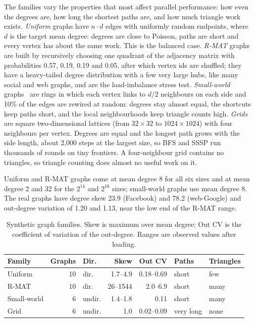 \documentclass[conference]{IEEEtran}
\begin{document}
The families vary the properties that most affect parallel performance: how even the degrees are, how long the shortest paths are, and how much triangle work exists. \textit{Uniform} graphs have $n\cdot d$ edges with uniformly random endpoints, where $d$ is the target mean degree: degrees are close to Poisson, paths are short and every vertex has about the same work. This is the balanced case. \textit{R-MAT} graphs~\cite{rmat} are built by recursively choosing one quadrant of the adjacency matrix with probabilities 0.57, 0.19, 0.19 and 0.05, after which vertex ids are shuffled; they have a heavy-tailed degree distribution with a few very large hubs, like many social and web graphs, and are the load-imbalance stress test. \textit{Small-world} graphs~\cite{ws} are rings in which each vertex links to $d/2$ neighbours on each side and 10\% of the edges are rewired at random: degrees stay almost equal, the shortcuts keep paths short, and the local neighbourhoods keep triangle counts high. \textit{Grids} are square two-dimensional lattices (from $32\times32$ to $1024\times1024$) with four neighbours per vertex. Degrees are equal and the longest path grows with the side length, about 2,000 steps at the largest size, so BFS and SSSP run thousands of rounds on tiny frontiers. A four-neighbour grid contains no triangles, so triangle counting does almost no useful work on it.

Uniform and R-MAT graphs come at mean degree 8 for all six sizes and at mean degree 2 and 32 for the $2^{14}$ and $2^{16}$ sizes; small-world graphs use mean degree 8. The real graphs have degree skew 23.9 (Facebook) and 78.2 (web-Google) and out-degree variation of 1.20 and 1.13, near the low end of the R-MAT range.

\begin{table}[!tb]
\caption{Synthetic graph families. Skew is maximum over mean degree; Out CV is the coefficient of variation of the out-degree. Ranges are observed values after loading.}
\label{tab:families}
\centering\footnotesize
\setlength{\tabcolsep}{3pt}
\begin{tabular}{@{}lrlrrll@{}}
\toprule
Family & Graphs & Dir. & Skew & Out CV & Paths & Triangles \\
\midrule
Uniform & 10 & dir. & 1.7--4.9 & 0.18--0.69 & short & few \\
R-MAT & 10 & dir. & 26--1544 & 2.0--6.9 & short & many \\
Small-world & 6 & undir. & 1.4--1.8 & 0.11 & short & many \\
Grid & 6 & undir. & 1.0 & 0.02--0.09 & very long & none \\
\bottomrule
\end{tabular}
\end{table}
\end{document}
